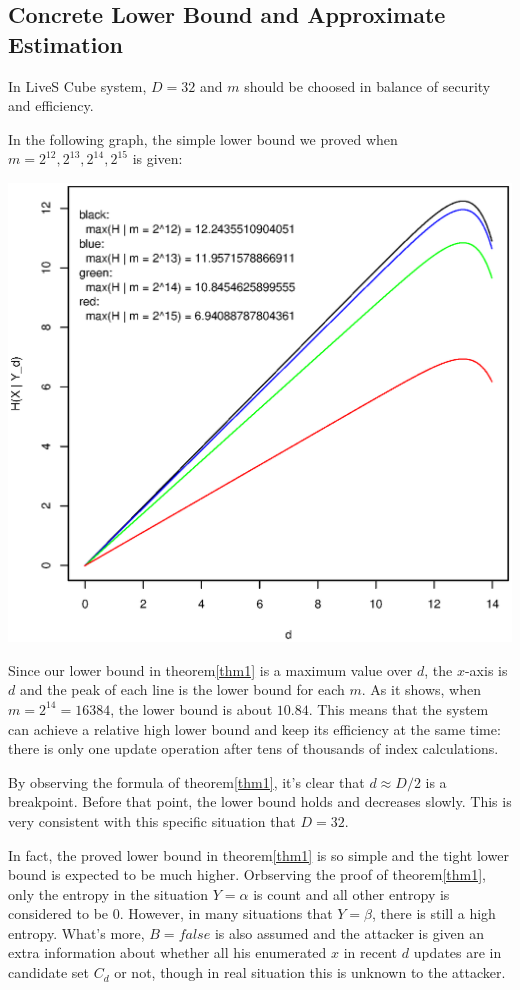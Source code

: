 \documentclass[10pt,a4paper]{article}
\begin{document}
	\subsection{Concrete Lower Bound and Approximate Estimation}
		In LiveS Cube system, $D = 32$ and $m$ should be
		choosed in balance of security and efficiency.
		
		In the following graph, the simple lower
		bound we proved when $m = 2^{12}, 2^{13}, 2^{14}, 2^{15}$ is given:
		
		\begin{center}
		\includegraphics[scale=0.6]{lb_m.eps}
		\end{center}
		
		Since our lower bound in theorem\ref{thm1} is a maximum value
		over $d$, the $x$-axis is $d$ and the peak of each line
		is the lower bound for each $m$. As it shows, when $m = 2^{14} = 16384$, the lower
		bound is about $10.84$. This means that the system can achieve
		a relative high lower bound and keep its efficiency at the same time:
		there is only one update operation after tens of thousands of index calculations.
		
		By observing the formula
		of theorem\ref{thm1}, it's clear that $d \approx D/2$ is a
		breakpoint. Before that point, the lower bound holds and
		decreases slowly. This is very consistent with this
		specific situation that $D = 32$.
		
		In fact, the proved lower bound in theorem\ref{thm1} is so
		simple and the tight lower bound is expected to be much higher.
		Orbserving the proof of theorem\ref{thm1}, only the
		entropy in the situation $Y = \alpha$ is count and
		all other entropy is considered to be $0$. However, in
		many situations that $Y = \beta$, there is still a high entropy.
		What's more, $B = false$ is also assumed and the attacker is
		given an extra information about whether all his enumerated $x$
		in recent $d$ updates are in candidate set $C_d$ or not, though
		in real situation this is unknown to the attacker.
		
\end{document}
